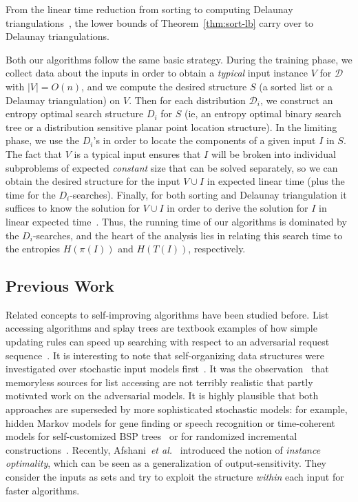 \documentclass{siamltex}
\newcommand{\D}{\mathcal{D}}
\newcommand{\etal}{\emph{et al.}}
\begin{document}
From the linear time reduction from sorting to computing Delaunay 
triangulations~\cite[Theorems~8.2.2 and 12.1.1]{BoissonnatYv98}, 
the lower bounds of Theorem~\ref{thm:sort-lb} 
carry over to Delaunay triangulations. 

Both our algorithms follow the same basic strategy. 
During the training phase, we collect data about the inputs in 
order to obtain a \emph{typical}
input instance $V$ for $\D$ with $|V| = O(n)$, and we 
compute the desired structure $S$ (a sorted list or a Delaunay
triangulation) on $V$.
Then for each distribution $\D_i$, we construct an entropy
optimal search structure $D_i$ for $S$ (ie, an entropy optimal
binary search tree or a distribution sensitive planar point location 
structure).  In the
limiting phase, we use the $D_i$'s in order to locate the
components of a given input $I$ in $S$.
The fact that $V$ is a typical input ensures that $I$ will
be broken into individual subproblems of expected \emph{constant} size
that can be solved separately, so we can obtain the desired
structure for the input $V \cup I$ in expected linear time 
(plus the time for the $D_i$-searches). Finally, for 
both sorting and Delaunay triangulation it suffices to know
the solution for $V \cup I$ in order to derive the solution for
$I$ in linear expected time~\cite{CDH+,ChazelleMu09}. Thus, the running time 
of our algorithms
is dominated by the $D_i$-searches, and the heart of the analysis
lies in relating this search time to the entropies $H(\pi(I))$ and
$H(T(I))$, respectively. 

\subsection{Previous Work}

Related concepts to self-improving algorithms
have been studied before.
List accessing algorithms and splay trees
are textbook examples of how simple updating
rules can speed up searching with respect
to an adversarial request 
sequence~\cite{sleatorTpage,sleatorT85,
albersW98,borodinE,hesterH}.
It is interesting to note that 
self-organizing data structures were
investigated over stochastic input 
models first~\cite{albersM98,allenM78,bitner,gonnetMS,mccabe,rivest}.
It was the observation~\cite{bentleyM} that 
memoryless sources for list accessing are not terribly
realistic that partly motivated work on the adversarial models.
It is highly plausible that both approaches are superseded by
more sophisticated stochastic models: for example,
hidden Markov models for gene finding or speech recognition
or time-coherent models for self-customized BSP trees~\cite{arCT}
or for randomized incremental constructions~\cite{ChazelleMu09b}.
Recently, Afshani~\etal~\cite{AfshaniBaCh09} introduced
the notion of \emph{instance optimality}, which can be
seen as a generalization of output-sensitivity. They consider
the inputs as sets and try to exploit the structure \emph{within}
each input for faster algorithms.
\end{document}
